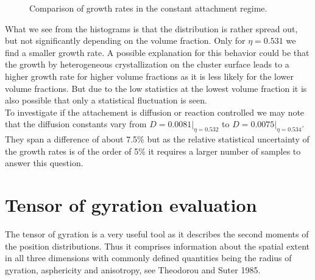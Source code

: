 \begin{figure}[ht]
\begin{center}
 \hspace{0.5cm}
\caption[Constant attachment rate measurements from production data]{Comparison of growth rates in the constant attachment regime.}
\label{fig:constant_growth_rates}
\end{center}
\end{figure}

What we see from the histograms is that the distribution is rather spread out, but not significantly depending on the volume fraction. Only for $\eta = 0.531$ we find a smaller growth rate. A possible explanation for this behavior could be that the growth by heterogeneous crystallization on the cluster surface leads to a higher growth rate for higher volume fractions as it is less likely for the lower volume fractions. But due to the low statistics at the lowest volume fraction it is also possible that only a statistical fluctuation is seen.\\ 
To investigate if the attachement is diffusion or reaction controlled we may note that the diffusion constants vary from $D=0.0081|_{\eta = 0.532}$ to $D=0.0075|_{\eta = 0.534}$. They span a difference of about 7.5\% but as the relative statistical uncertainty of the growth rates is of the order of 5\% it requires a larger number of samples to answer this question.

\section{Tensor of gyration evaluation}
\label{sec:tog}
The tensor of gyration is a very useful tool as it describes the second moments of the position distributions. Thus it comprises information about the spatial extent in all three dimensions with commonly defined quantities being the radius of gyration, asphericity and anisotropy, see Theodorou and Suter 1985\cite{Theodorou1985}.\\


